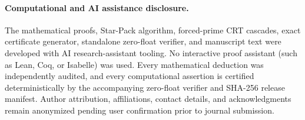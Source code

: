 \documentclass[11pt]{article}
\theoremstyle{remark}
\begin{document}
\paragraph{Computational and AI assistance disclosure.}
The mathematical proofs, Star-Pack algorithm, forced-prime CRT cascades, exact
certificate generator, standalone zero-float verifier, and manuscript text were
developed with AI research-assistant tooling. No interactive proof assistant
(such as Lean, Coq, or Isabelle) was used. Every mathematical deduction was
independently audited, and every computational assertion is certified
deterministically by the accompanying zero-float verifier and SHA-256 release
manifest. Author attribution, affiliations, contact details, and acknowledgments
remain anonymized pending user confirmation prior to journal submission.



\end{document}
